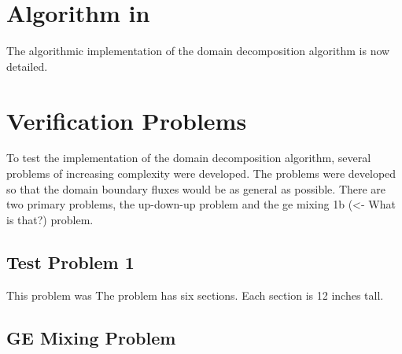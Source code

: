 \section{Algorithm in \cobra{}}
\label{sec:dd:algo}

The algorithmic implementation of the domain decomposition algorithm is now detailed.

\section{Verification Problems}
\label{sec:dd:verify}
To test the implementation of the domain decomposition algorithm, several problems of increasing complexity were developed.
The problems were developed so that the domain boundary fluxes would be as general as possible.
There are two primary problems, the up-down-up problem and the ge mixing 1b (<- What is that?) problem.

\subsection{Test Problem 1}
\label{ss:dd:ver:tp1}
This problem was 
The problem has six sections.
Each section is 12 inches tall.

\subsection{GE Mixing Problem}
\label{ss:dd:ver:gem}



